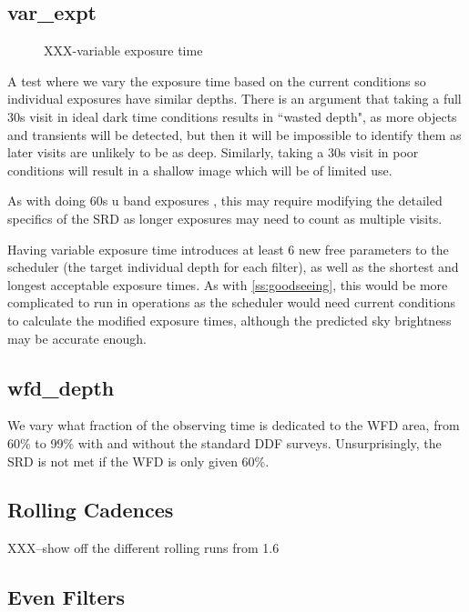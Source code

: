 \subsection{var\_expt}


\begin{figure}
\caption{XXX-variable exposure time}\label{fig:varexptime}
\end{figure}

A test where we vary the exposure time based on the current conditions so individual exposures have similar depths. There is an argument that taking a full 30s visit in ideal dark time conditions results in ``wasted depth", as more objects and transients will be detected, but then it will be impossible to identify them as later visits are unlikely to be as deep. Similarly, taking a 30s visit in poor conditions will result in a shallow image which will be of limited use.

As with doing 60s u band exposures , this may require modifying the detailed specifics of the SRD as longer exposures may need to count as multiple visits.

Having variable exposure time introduces at least 6 new free parameters to the scheduler (the target individual depth for each filter), as well as the shortest and longest acceptable exposure times.  As with \ref{ss:goodseeing}, this would be more complicated to run in operations as the scheduler would need current conditions to calculate the modified exposure times, although the predicted sky brightness may be accurate enough.



\subsection{wfd\_depth}

We vary what fraction of the observing time is dedicated to the WFD area, from 60\% to 99\% with and without the standard DDF surveys. Unsurprisingly, the SRD is not met if the WFD is only given 60\%.



\subsection{Rolling Cadences}

XXX--show off the different rolling runs from 1.6

\subsection{Even Filters}

